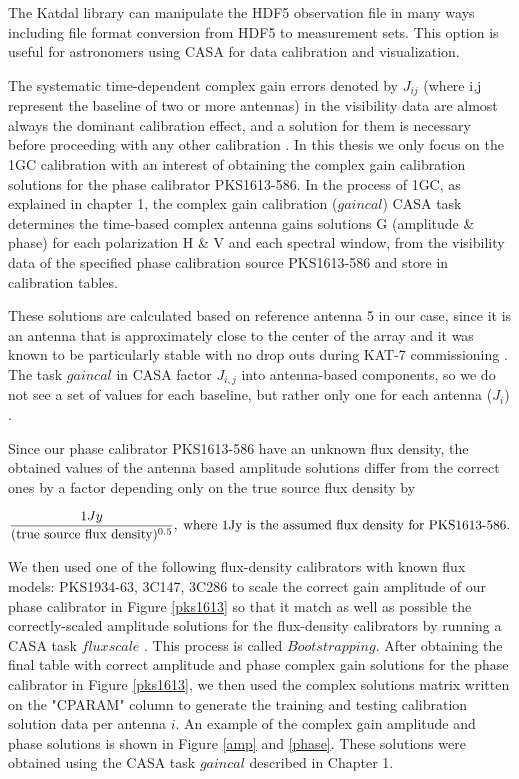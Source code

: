 The Katdal library can manipulate the HDF5 observation file in many ways including file format conversion from HDF5 to measurement sets. This option is useful for astronomers using CASA for data calibration and visualization.
 
The systematic time-dependent complex gain errors denoted by $J_{ij}$ (where i,j represent the baseline of two or more antennas) in the visibility data are almost always the dominant calibration effect, and a solution for them is necessary before proceeding with any other calibration \citep{ott2013casa}. In this thesis we only focus on the 1GC calibration with an interest of obtaining the complex gain calibration solutions for the phase calibrator PKS1613-586. In the process of 1GC, as explained in chapter 1, the complex gain calibration ($\textit{gaincal}$)  CASA task determines the time-based complex antenna gains solutions G (amplitude \& phase) for each polarization H \& V and each spectral window, from the visibility data of the specified phase calibration source PKS1613-586 and store in calibration tables.
 
These solutions are calculated based on reference antenna 5 in our case, since it is an antenna that is approximately close to the center of the array and it was known to be particularly stable with no drop outs during KAT-7 commissioning \citep{ott2013casa}. The task $\textit{gaincal}$ in CASA factor $J_{i,j}$ into antenna-based components, so we do not see a set of values for each baseline, but rather only one for each antenna ($J_i$) \citep{CosmoAIMS}. 

Since our phase calibrator PKS1613-586 have an unknown flux density, the obtained values of the antenna based amplitude solutions differ from the correct ones by a factor depending only on the true source flux density by 

\begin{equation}
\frac{1 Jy}{(\text{true source flux density})^{0.5}},\;  \text{where 1Jy is the assumed flux density for \text{PKS1613-586}}.
\end{equation} 

We then used one of the following flux-density calibrators with known flux models: PKS1934-63, 3C147, 3C286 to scale the correct gain amplitude of our phase calibrator in Figure \ref{pks1613} so that it match as well as possible the correctly-scaled amplitude solutions for the flux-density calibrators by running a CASA task $\textit{fluxscale}$ \citep{CosmoAIMS}. This process is called $\textit{Bootstrapping}$. After obtaining the final table with correct amplitude and phase complex gain solutions for the phase calibrator in Figure \ref{pks1613}, we then used the complex solutions matrix written on the "CPARAM" column to generate the training and testing calibration solution data per antenna $i$. An example of the complex gain amplitude and phase solutions is shown in Figure \ref{amp} and \ref{phase}. These solutions were obtained using the CASA task $gaincal$ described in Chapter 1. 

